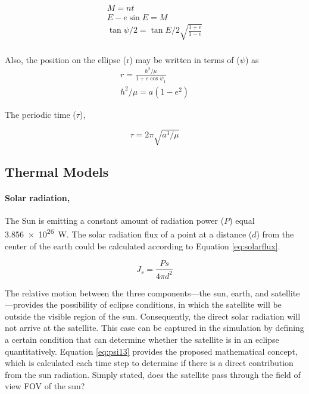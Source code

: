 \documentclass[11pt]{article}
\begin{document}
\begin{gather}\label{eq:12}
    M = n t \\
    E-e\sin{E} = M \\
    \tan{\psi/2} = \tan{E/2}\sqrt{\frac{1+e}{1-e}} \\
\end{gather}

Also, the position on the ellipse (r) may be written in terms of ($\psi$) as
\begin{gather}\label{eq:14}
    r = \frac{h^2/\mu}{1+e\cos{\psi_1}}\\
    h^2/\mu = a(1-e^2)
\end{gather}

The periodic time ($\tau$),
 
\begin{equation}
    \tau = 2\pi\sqrt{a^3/\mu}
\end{equation}



\subsection{Thermal Models}
\paragraph{Solar radiation,} The Sun is emitting a constant amount of radiation power ($P$) equal \SI{3.856e26}{\watt}. The solar radiation flux of a point at a distance ($d$) from the center of the earth could be calculated according to Equation \ref{eq:solarflux}.

\begin{equation} \label{eq:solarflux}
    J_s = \frac{Ps}{4\pi d^2}
\end{equation}





The relative motion between the three components—the sun, earth, and satellite—provides the possibility of eclipse conditions, in which the satellite will be outside the visible region of the sun. Consequently, the direct solar radiation will not arrive at the satellite. This case can be captured in the simulation by defining a certain condition that can determine whether the satellite is in an eclipse quantitatively. Equation \ref{eq:psi13} provides the proposed mathematical concept, which is calculated each time step to determine if there is a direct contribution from the sun radiation. Simply stated, does the satellite pass through the field of view \ac{FOV} of the sun?
\end{document}
